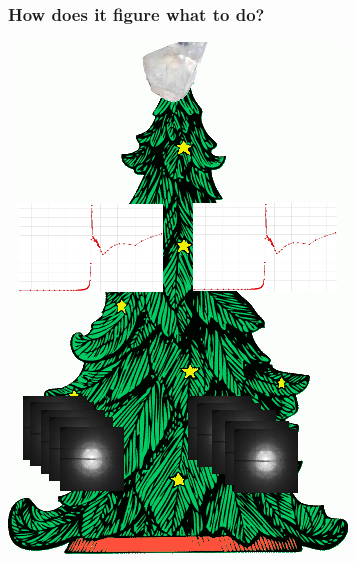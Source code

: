 \documentclass[slides,compress]{beamer}
\begin{document}
\begin{frame}
\frametitle{How does it figure what to do?}
\hspace{4cm}
\includegraphics[scale=0.5]{figures/christmas-tree-with-sweeps.png}
\end{frame}
\end{document}
